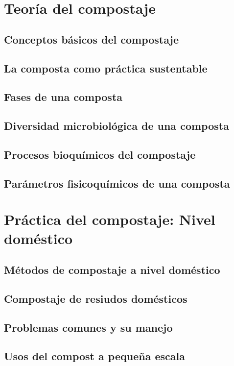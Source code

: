 \documentclass{ManualBiotecnologico}
\begin{document}
    \frontmatter

\Portada
\Indices
    
    \mainmatter

\part{Teoría del compostaje}

    \chapter{Conceptos básicos del compostaje}
    \chapter{La composta como práctica sustentable}
    \chapter{Fases de una composta}
    \chapter{Diversidad microbiológica de una composta}
    \chapter{Procesos bioquímicos del compostaje}
    \chapter{Parámetros fisicoquímicos de una composta}

\part{Práctica del compostaje: Nivel doméstico}

    \chapter{Métodos de compostaje a nivel doméstico}
    \chapter{Compostaje de resiudos domésticos}
    \chapter{Problemas comunes y su manejo}
    \chapter{Usos del compost a pequeña escala}
    
\end{document}
